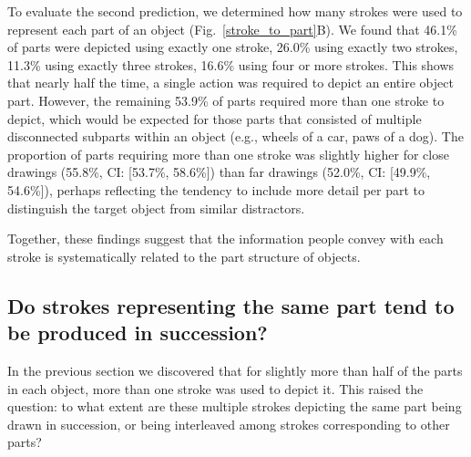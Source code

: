 \documentclass[10pt,letterpaper]{article}
\newcommand{\jefan}[1]{{\color{blue}{[jefan: #1]}}}
\begin{document}
To evaluate the second prediction, we determined how many strokes were used to represent each part of an object (Fig.~\ref{stroke_to_part}B). 
We found that 46.1\% of parts were depicted using exactly one stroke, 26.0\% using exactly two strokes, 11.3\% using exactly three strokes, 16.6\% using four or more strokes. 
This shows that nearly half the time, a single action was required to depict an entire object part. 
However, the remaining 53.9\% of parts required more than one stroke to depict, which would be expected for those parts that consisted of multiple disconnected subparts within an object (e.g., wheels of a car, paws of a dog).
The proportion of parts requiring more than one stroke was slightly higher for close drawings (55.8\%, CI: [53.7\%, 58.6\%]) than far drawings (52.0\%, CI: [49.9\%, 54.6\%]), perhaps reflecting the tendency to include more detail per part to distinguish the target object from similar distractors. 

Together, these findings suggest that the information people convey with each stroke is systematically related to the part structure of objects. 

\subsection{Do strokes representing the same part tend to be produced in succession?}

In the previous section we discovered that for slightly more than half of the parts in each object, more than one stroke was used to depict it. 
This raised the question: to what extent are these multiple strokes depicting the same part being drawn in succession, or being interleaved among strokes corresponding to other parts?

\end{document}
